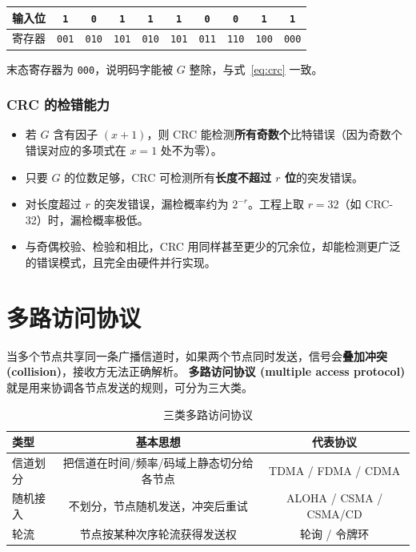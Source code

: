 \begin{center}
\begin{tabular}{cccccccccc}
\toprule
输入位 & \texttt{1} & \texttt{0} & \texttt{1} & \texttt{1} & \texttt{1} & \texttt{0} & \texttt{0} & \texttt{1} & \texttt{1}\\
\midrule
寄存器 & \texttt{001} & \texttt{010} & \texttt{101} & \texttt{010} & \texttt{101} & \texttt{011} & \texttt{110} & \texttt{100} & \texttt{000}\\
\bottomrule
\end{tabular}
\end{center}
末态寄存器为 \texttt{000}，说明码字能被 $G$ 整除，与式~\eqref{eq:crc} 一致。

\subsubsection{CRC 的检错能力}

\begin{itemize}
    \item 若 $G$ 含有因子 $(x+1)$，则 CRC 能检测\textbf{所有奇数个}比特错误（因为奇数个错误对应的多项式在 $x=1$ 处不为零）。
    \item 只要 $G$ 的位数足够，CRC 可检测所有\textbf{长度不超过 $r$ 位}的突发错误。
    \item 对长度超过 $r$ 的突发错误，漏检概率约为 $2^{-r}$。工程上取 $r=32$（如 CRC-32）时，漏检概率极低。
    \item 与奇偶校验、检验和相比，CRC 用同样甚至更少的冗余位，却能检测更广泛的错误模式，且完全由硬件并行实现。
\end{itemize}

\section{多路访问协议}

当多个节点共享同一条广播信道时，如果两个节点同时发送，信号会\textbf{叠加冲突 (collision)}，接收方无法正确解析。
\textbf{多路访问协议 (multiple access protocol)} 就是用来协调各节点发送的规则，可分为三大类。

\begin{table}[H]
\centering
\caption{三类多路访问协议}
\begin{tabulary}{\textwidth}{@{}LCC@{}}
\toprule
\textbf{类型} & \textbf{基本思想} & \textbf{代表协议} \\
\midrule
信道划分 & 把信道在时间/频率/码域上静态切分给各节点 & TDMA / FDMA / CDMA \\
随机接入 & 不划分，节点随机发送，冲突后重试 & ALOHA / CSMA / CSMA/CD \\
轮流 & 节点按某种次序轮流获得发送权 & 轮询 / 令牌环 \\
\bottomrule
\end{tabulary}
\end{table}

